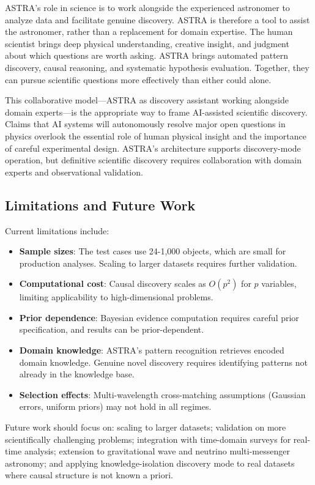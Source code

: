 \documentclass[usenatbib]{rasti}
\begin{document}
ASTRA's role in science is to work alongside the experienced astronomer to analyze data and facilitate genuine discovery. ASTRA is therefore a tool to assist the astronomer, rather than a replacement for domain expertise. The human scientist brings deep physical understanding, creative insight, and judgment about which questions are worth asking. ASTRA brings automated pattern discovery, causal reasoning, and systematic hypothesis evaluation. Together, they can pursue scientific questions more effectively than either could alone.

This collaborative model---ASTRA as discovery assistant working alongside domain experts---is the appropriate way to frame AI-assisted scientific discovery. Claims that AI systems will autonomously resolve major open questions in physics overlook the essential role of human physical insight and the importance of careful experimental design. ASTRA's architecture supports discovery-mode operation, but definitive scientific discovery requires collaboration with domain experts and observational validation.

\subsection{Limitations and Future Work}

Current limitations include:
\begin{itemize}
\item \textbf{Sample sizes}: The test cases use 24-1,000 objects, which are small for production analyses. Scaling to larger datasets requires further validation.
\item \textbf{Computational cost}: Causal discovery scales as $O(p^2)$ for $p$ variables, limiting applicability to high-dimensional problems.
\item \textbf{Prior dependence}: Bayesian evidence computation requires careful prior specification, and results can be prior-dependent.
\item \textbf{Domain knowledge}: ASTRA's pattern recognition retrieves encoded domain knowledge. Genuine novel discovery requires identifying patterns not already in the knowledge base.
\item \textbf{Selection effects}: Multi-wavelength cross-matching assumptions (Gaussian errors, uniform priors) may not hold in all regimes.
\end{itemize}

Future work should focus on: scaling to larger datasets; validation on more scientifically challenging problems; integration with time-domain surveys for real-time analysis; extension to gravitational wave and neutrino multi-messenger astronomy; and applying knowledge-isolation discovery mode to real datasets where causal structure is not known a priori.
\end{document}
